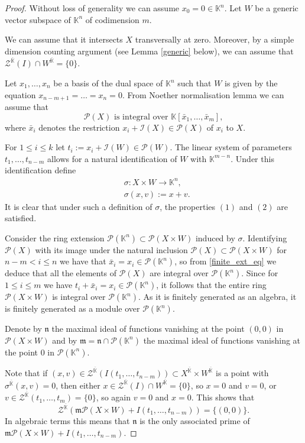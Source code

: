 \documentclass[10pt,a4paper]{amsart}
\newcommand{\I}{\mathcal{I}}
\newcommand{\K}{\mathbb{K}}
\newcommand{\PP}{\mathcal{P}}
\newcommand{\Z}{\mathcal{Z}}
\begin{document}
\begin{proof}
Without loss of generality we can assume $x_0=0\in\K^n$. Let $W$ be a generic vector subspace of $\K^n$ of codimension $m$. 


We can assume that it intersects $X$ transversally at zero. Moreover, by a simple dimension counting argument (see Lemma \ref{generic} below), we can assume that $\Z^{\overline{\K}}(I)\cap W^{\overline{\K}}=\{0\}$. 

Let $x_1,\dots,x_n$ be a basis of the dual space of $\K^n$ such that $W$ is given by the equation $x_{n-m+1}=\dots=x_n=0$. From Noether normalisation lemma we can assume that
\begin{equation}\label{finite_ext_eq}
	\PP(X) \text{ is integral over }\K[\bar{x}_1,\dots,\bar{x}_m],
\end{equation} 
where $\bar{x}_i$ denotes the restriction $x_i+\I(X)\in\PP(X)$ of $x_i$ to $X$.

For $1\leq i\leq k$ let $t_i:=x_i+\I(W)\in\PP(W)$. The linear system of parameters $t_1,\dots,t_{n-m}$ allows for a natural identification of $W$ with $\K^{m-n}$. Under this identification define
\begin{align*}
	&\sigma:X\times W\rightarrow \K^n,\\
	&\sigma(x,v):=x+v.
\end{align*}  
It is clear that under such a definition of $\sigma$, the properties $(1)$ and $(2)$ are satisfied. 


Consider the ring extension $\PP(\K^n)\subset \PP(X\times W)$ induced by $\sigma$. Identifying $\PP(X)$ with its image under the natural inclusion $\PP(X)\subset \PP(X\times W)$ for $n-m< i \leq n$ we have that $\bar{x}_i= x_i\in \PP(\K^n)$, so from \eqref{finite_ext_eq} we deduce that all the elements of $\PP(X)$ are integral over $\PP(\K^n)$. Since for $1\leq i \leq m$ we have $t_i+\bar{x}_i= x_i\in \PP(\K^n)$, it follows that the entire ring $\PP(X\times W)$ is integral over $\PP(\K^n)$. As it is finitely generated as an algebra, it is finitely generated as a module over $\PP(\K^n)$. 

Denote by $\mathfrak{n}$ the maximal ideal of functions vanishing at the point $(0,0)$ in $\PP(X\times W)$ and by $\mathfrak{m}=\mathfrak{n}\cap \PP(\K^n)$ the maximal ideal of functions vanishing at the point $0$ in $\PP(\K^n)$. 

Note that if $(x,v)\in \Z^{\overline{\K}}(I(t_1,\dots,t_{n-m}))\subset X^{\overline{\K}}\times W^{\overline{\K}}$ is a point with $\sigma^{\overline{\K}}(x,v)=0$, then either $x\in \Z^{\overline{\K}}(I)\cap W^{\overline{\K}}=\{0\}$, so $x=0$ and $v=0$, or $v\in \Z^{\overline{\K}}(t_1,\dots,t_m)=\{0\}$, so again $v=0$ and $x=0$. This shows that 
\begin{equation*}
    \Z^{\overline{\K}}(\mathfrak{m}\PP(X\times W) +I(t_1,\dots,t_{n-m}))=\{(0,0)\}.
\end{equation*}
In algebraic terms this means that $\mathfrak{n}$ is the only associated prime of $\mathfrak{m}\PP(X\times W) +I(t_1,\dots,t_{n-m})$.


\end{proof}
\end{document}
